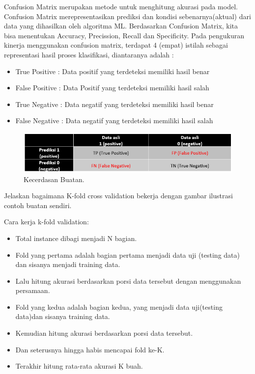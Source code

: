 \noindent
Confusion Matrix merupakan metode untuk menghitung akurasi pada model. Confusion Matrix merepresentasikan prediksi dan kondisi sebenarnya(aktual) dari data yang dihasilkan oleh algoritma ML. Berdasarkan Confusion Matrix, kita bisa menentukan Accuracy, Precission, Recall dan Specificity. Pada pengukuran kinerja menggunakan confusion matrix, terdapat 4 (empat) istilah sebagai representasi hasil proses klasifikasi, diantaranya adalah :
\begin{itemize}
    \item True Positive : Data positif yang terdeteksi memiliki hasil benar
    \item False Positive : Data Positif yang terdeteksi memiliki hasil salah
    \item True Negative : Data negatif yang terdeteksi memiliki hasil benar
    \item False Negative : Data negatif yang terdeteksi memiliki hasil salah
\end{itemize}

\hfill\break
\begin{figure}[H]
    \includegraphics[width=1\textwidth]{figures/1174006/chapter2/teori/6.png}
    \centering
    \caption{Kecerdasan Buatan.}
\end{figure}

\noindent
Jelaskan  bagaimana  K-fold  cross  validation  bekerja  dengan  gambar  ilustrasi contoh buatan sendiri.

\noindent
Cara kerja k-fold validation:
\begin{itemize}
	\item Total instance dibagi menjadi N bagian.
	\item Fold yang pertama adalah bagian pertama menjadi data uji (testing data) dan sisanya menjadi training data.
	\item Lalu hitung akurasi berdasarkan porsi data tersebut dengan menggunakan persamaan.
	\item Fold yang kedua adalah bagian kedua, yang menjadi data uji(testing data)dan sisanya training  data.
	\item Kemudian hitung akurasi berdasarkan porsi data tersebut.
	\item Dan seterusnya hingga habis mencapai fold ke-K.
	\item Terakhir hitung rata-rata akurasi K buah.
\end{itemize}

